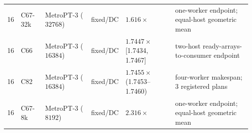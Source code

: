 \begin{table}[!t]
\begin{tabular}{@{}cllllp{4.0cm}@{}}
16 & C67-32k & MetroPT-3 ($32768$) & fixed/DC & $1.616\times$ & one-worker endpoint; equal-host geometric mean \\
16 & C66 & MetroPT-3 ($16384$) & fixed/DC & $1.7447\times$ [1.7434, 1.7467] & two-host ready-arrays-to-consumer endpoint \\
16 & C82 & MetroPT-3 ($16384$) & fixed/DC & $1.7455\times$ (1.7453--1.7460) & four-worker makespan; 3 registered plans \\
16 & C67-8k & MetroPT-3 ($8192$) & fixed/DC & $2.316\times$ & one-worker endpoint; equal-host geometric mean \\
\bottomrule
\end{tabular}
\end{table}
